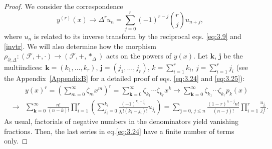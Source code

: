 \documentclass[10pt]{amsart}
\numberwithin{equation}{section}
\theoremstyle{definition}
\begin{document}
\begin{proof}
We consider the correspondence  %
\begin{equation}
y^{(r)}(x)\to \Delta ^{r} u_{n}=\sum _{j=0}^{r}(-1)^{r-j}\binom{r}{j}u_{n+j},
\label{eq5.23}
\end{equation}
where $u_{n}$ is related to its inverse transform by the reciprocal eqs.
 \eqref{eq:3.9} and  \eqref{invtr}. We will also determine how the morphism
$\rho _{\partial ,\Delta}: (\mathcal{F},+,\cdot )\rightarrow (
\mathcal{F},+,*_{\Delta})$ acts on the powers of $y(x)$. Let
$\mathbf{k}$, $\mathbf{j}$ be the multiindices:
$\mathbf{k}=(k_{1},\ldots ,k_{r})$,
$\mathbf{j}=(j_{1},\ldots ,j_{r})$, $k=\sum _{i=1}^{r} k_{i}$,
$j=\sum _{i=1}^{r} j_{i}$ (see the Appendix~\ref{AppendixB} for a detailed
proof of eqs.  \eqref{eq:3.24} and  \eqref{eq:3.25}):
\begin{eqnarray}
\label{eq:3.24}
&& y(x)^{r}=\left (\sum _{m=0}^{\infty} \zeta _{m} x^{m}\right )^{r}=
\sum _{\mathbf{k}=0}^{\infty} \zeta _{k_{1}}\cdots \zeta _{k_{r}} x^{k}
\to \sum _{\mathbf{k} =0}^{\infty} \zeta _{k_{1}}\cdots \zeta _{k_{r}}
p_{k}(x)
\\
\nonumber
&\to & \sum _{\mathbf{k}=0}^{\infty} \frac{n!}{(n-k)!}\prod _{i=1}^{r}
\left (\sum _{j_{i}=0}^{k_{i}}
\frac{(-1)^{k_{i}-j_{i}}}{j_{i}!(k_{i}-j_{i})!}u_{j_{i}}\right ) =
\sum _{\mathbf{j}=0,\,j\le n} \frac{(1-r)^{n -j }n!}{(n-j)! }\prod _{i=1}^{r}
\frac{u_{j_{i}}}{j_{i}!}.
\end{eqnarray}
As usual, factorials of negative numbers in the denominators yield vanishing
fractions. Then, the last series in eq.\eqref{eq:3.24} have a finite number
of terms only.


\end{proof}
\end{document}
